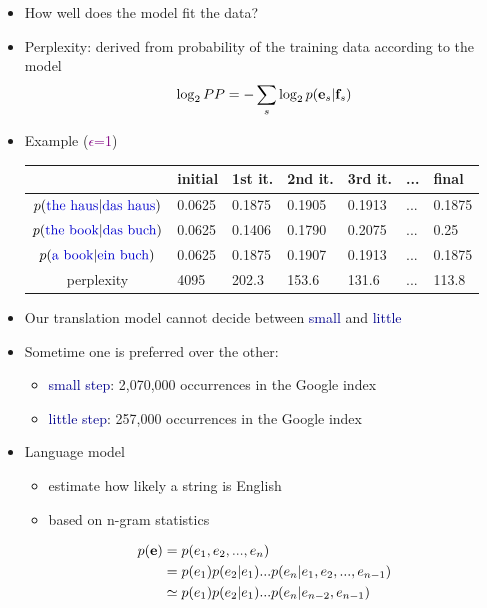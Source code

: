 \documentclass[landscape]{slides}
\newcommand{\example}[1]{\textcolor{darkblue}{\rm #1}}
\newcommand{\maths}[1]{\textcolor{purple}{#1}}
\begin{document}
\begin{itemize} 
\item How well does the model fit the data?
\item Perplexity: derived from probability of the training data according to the model
\maths{\begin{equation*}
\log_2 PP = -\sum_s \log_2 p({\bf e}_s |{\bf f}_s )
\end{equation*}}\vspace{-10mm}
\item Example (\maths{$\epsilon$=1})\\[10mm]
\begin{tabular}{|c|l|l|l|l|l|l|} \hline
& initial & 1st it. & 2nd it. & 3rd it. & ... & final \\ \hline
\maths{$p(\text{\example{the haus}}|\text{\example{das haus}})$} & 0.0625 & 0.1875 & 0.1905 & 0.1913 &...& 0.1875\\ \hline
\maths{$p(\text{\example{the book}}|\text{\example{das buch}})$} & 0.0625 & 0.1406 & 0.1790 & 0.2075 &...& 0.25  \\ \hline
\maths{$p(\text{\example{a book}}|\text{\example{ein buch}})$}   & 0.0625 & 0.1875 & 0.1907 & 0.1913 &...& 0.1875\\ \hline
perplexity & 4095 & 202.3 & 153.6 & 131.6 & ... & 113.8 \\ \hline
\end{tabular}
\end{itemize}


\begin{itemize}
\item Our translation model cannot decide between \example{small} and \example{little}
\item Sometime one is preferred over the other:
\begin{itemize}
\item \example{small step}: 2,070,000 occurrences in the Google index 
\item \example{little step}: 257,000 occurrences in the Google index 
\end{itemize}
\item Language model
\begin{itemize}
\item estimate how likely a string is English
\item based on n-gram statistics
\end{itemize}
\maths{\begin{equation*}
\begin{split}
p({\bf e}) &= p(e_1,e_2,...,e_n) \\
 &= p(e_1) p(e_2|e_1) ... p(e_n|e_1,e_2,...,e_{n-1}) \\
 &\simeq p(e_1) p(e_2|e_1) ... p(e_n|e_{n-2},e_{n-1})
\end{split}
\end{equation*}}
\end{itemize}
\end{document}
